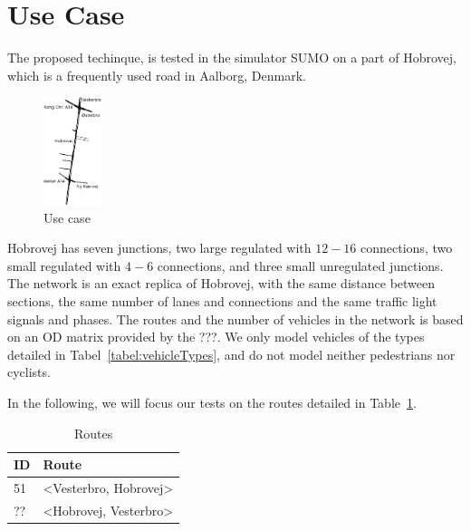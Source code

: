 \section{Use Case}
The proposed techinque, \tech is tested in the simulator SUMO on a part of Hobrovej, which is a frequently used road in Aalborg, Denmark.

\begin{figure}[htb]
\centering
\includegraphics[width=0.15\textwidth]{images/Hobrovej.png}
\caption{Use case}
\label{fig:Introduction:hobro}
\end{figure}

Hobrovej has seven junctions, two large regulated with $12-16$ connections, two small regulated with $4-6$ connections, and three small unregulated junctions.
The network is an exact replica of Hobrovej, with the same distance between sections, the same number of lanes and connections and the same traffic light signals and phases.
The routes and the number of vehicles in the network is based on an OD matrix provided by the ???.
We only model vehicles of the types detailed in Tabel~\ref{tabel:vehicleTypes}, and do not model neither pedestrians nor cyclists.

In the following, we will focus our tests on the routes detailed in Table~\ref{tb:useCase:routes}.
\begin{table} %
\centering
\begin{tabular}{|l|l|}\hline
\textbf{ID} & \textbf{Route}\\\hline
51 & <Vesterbro, Hobrovej>\\\hline
?? & <Hobrovej, Vesterbro>\\\hline
\end{tabular}
\caption{Routes}\label{tb:useCase:routes}
\end{table}